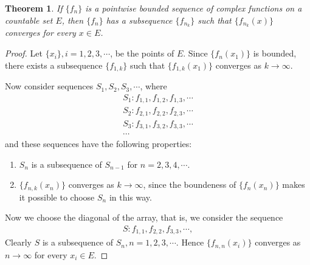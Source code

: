 \documentclass[11pt]{book}
\newtheorem{theorem}{Theorem}[chapter]
\theoremstyle{definition}
\numberwithin{equation}{chapter}
\begin{document}
\begin{theorem}\label{th_614}
If $\{f_n\}$ is a pointwise bounded sequence of complex functions on a countable set $E$, then $\{f_n\}$ has a subsequence $\{f_{n_k}\}$ such that $\{f_{n_k}(x)\}$ converges for every $x \in E$.
\end{theorem}
\begin{proof}
Let $\{x_i\}, i = 1,2,3,\cdots$, be the points of $E$. Since $\{f_n(x_1)\}$ is bounded, there exists a subsequence $\{f_{1,k}\}$ such that $\{f_{1,k}(x_1)\}$ converges as $k \to \infty$.

Now consider sequences $S_1, S_2, S_3, \cdots$, where
\begin{align*}
    S_1: f_{1,1}, f_{1,2}, f_{1,3}, \cdots \\
    S_2: f_{2,1}, f_{2,2}, f_{2,3}, \cdots \\
    S_3: f_{3,1}, f_{3,2}, f_{3,3}, \cdots \\
    \cdots
\end{align*}
and these sequences have the following properties:
\begin{enumerate}[label=(\alph*)]
    \item $S_n$ is a subsequence of $S_{n-1}$ for $n = 2,3,4,\cdots$.
    
    \item $\{f_{n,k}(x_n)\}$ converges as $k \to \infty$, since the boundeness of $\{f_n(x_n)\}$ makes it possible to choose $S_n$ in this way.
    
\end{enumerate}
Now we choose the diagonal of the array, that is, we consider the sequence
\begin{align*}
    S: f_{1,1}, f_{2,2}, f_{3,3}, \cdots,
\end{align*}
Clearly $S$ is a subsequence of $S_n, n = 1,2,3,\cdots$. Hence $\{f_{n,n}(x_i)\}$ converges as $n \to \infty$ for every $x_i \in E$.
\end{proof}

\medskip
\end{document}
